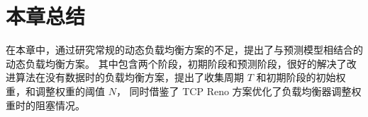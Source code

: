 \section{本章总结}

在本章中，通过研究常规的动态负载均衡方案的不足，提出了与预测模型相结合的动态负载均衡方案。
其中包含两个阶段，初期阶段和预测阶段，很好的解决了改进算法在没有数据时的负载均衡方案，提出了收集周期 $T$ 和初期阶段的初始权重，和调整权重的阈值 $N$，
同时借鉴了 TCP Reno 方案优化了负载均衡器调整权重时的阻塞情况。
